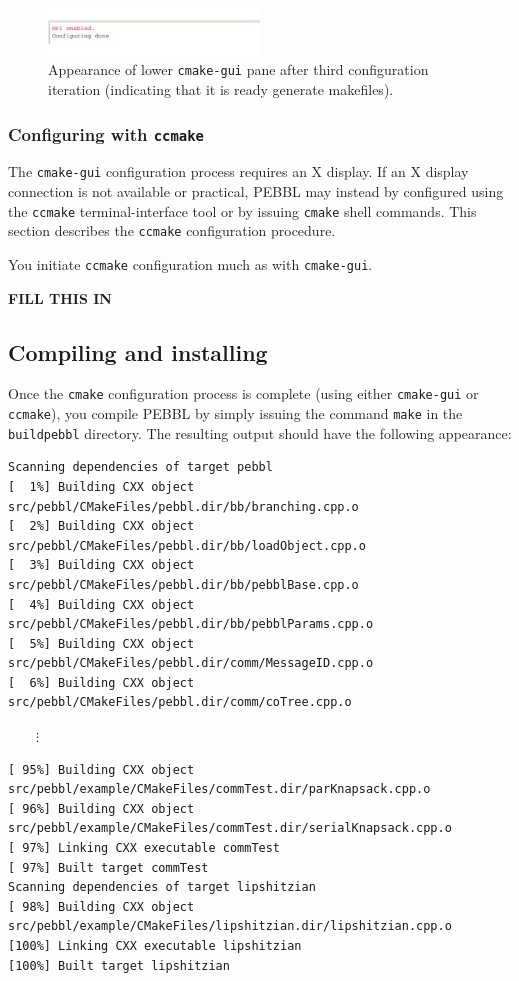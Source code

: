 \begin{figure}[tpb]
\begin{center}
\includegraphics[width=0.5\textwidth]{cmake5}
\vspace{-0.3in}
\end{center}{}
\caption{Appearance of lower \texttt{cmake-gui} pane after third
configuration iteration (indicating that it is ready generate makefiles).
  \label{fig:cmake5}}
\end{figure}

\subsubsection{Configuring with \texttt{ccmake}}
The \texttt{cmake-gui} configuration process requires an X display.  If an X
display connection is not available or practical, PEBBL may instead by
configured using the \texttt{ccmake} terminal-interface tool or by issuing
\texttt{cmake} shell commands.  This section describes the \texttt{ccmake}
configuration procedure.

You initiate \texttt{ccmake} configuration much as with \texttt{cmake-gui}.

\textbf{FILL THIS IN}

\subsection{Compiling and installing}
Once the \texttt{cmake} configuration process is complete (using either
\texttt{cmake-gui} or \texttt{ccmake}), you compile PEBBL by simply issuing
the command \texttt{make} in the \texttt{buildpebbl} directory.  The resulting
output should have the following appearance:
{\footnotesize
\begin{verbatim}
Scanning dependencies of target pebbl
[  1%] Building CXX object src/pebbl/CMakeFiles/pebbl.dir/bb/branching.cpp.o
[  2%] Building CXX object src/pebbl/CMakeFiles/pebbl.dir/bb/loadObject.cpp.o
[  3%] Building CXX object src/pebbl/CMakeFiles/pebbl.dir/bb/pebblBase.cpp.o
[  4%] Building CXX object src/pebbl/CMakeFiles/pebbl.dir/bb/pebblParams.cpp.o
[  5%] Building CXX object src/pebbl/CMakeFiles/pebbl.dir/comm/MessageID.cpp.o
[  6%] Building CXX object src/pebbl/CMakeFiles/pebbl.dir/comm/coTree.cpp.o
\end{verbatim}
\vspace{-1.3ex}
$\qquad\vdots$
\begin{verbatim}
[ 95%] Building CXX object src/pebbl/example/CMakeFiles/commTest.dir/parKnapsack.cpp.o
[ 96%] Building CXX object src/pebbl/example/CMakeFiles/commTest.dir/serialKnapsack.cpp.o
[ 97%] Linking CXX executable commTest
[ 97%] Built target commTest
Scanning dependencies of target lipshitzian
[ 98%] Building CXX object src/pebbl/example/CMakeFiles/lipshitzian.dir/lipshitzian.cpp.o
[100%] Linking CXX executable lipshitzian
[100%] Built target lipshitzian
\end{verbatim}
}

